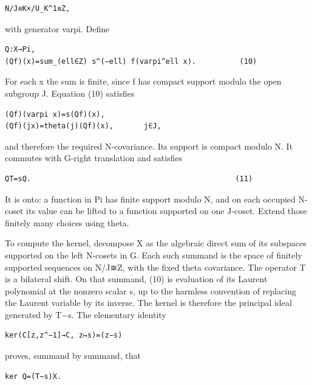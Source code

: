 \begin{Verbatim}[fontsize=\small,breaklines=true,breakanywhere=true]
N/J≅K×/U_K^1≅Z,
\end{Verbatim}

with generator varpi. Define

\begin{Verbatim}[fontsize=\small,breaklines=true,breakanywhere=true]
Q:X→Pi,
(Qf)(x)=sum_(ell∈Z) s^(−ell) f(varpi^ell x).          (10)
\end{Verbatim}

For each x the sum is finite, since f has compact support modulo the
open subgroup J. Equation (10) satisfies

\begin{Verbatim}[fontsize=\small,breaklines=true,breakanywhere=true]
(Qf)(varpi x)=s(Qf)(x),
(Qf)(jx)=theta(j)(Qf)(x),       j∈J,
\end{Verbatim}

and therefore the required N-covariance. Its support is compact modulo
N. It commutes with G-right translation and satisfies

\begin{Verbatim}[fontsize=\small,breaklines=true,breakanywhere=true]
QT=sQ.                                               (11)
\end{Verbatim}

It is onto: a function in Pi has finite support modulo N, and on each
occupied N-coset its value can be lifted to a function supported on one
J-coset. Extend those finitely many choices using theta.

To compute the kernel, decompose X as the algebraic direct sum of its
subspaces supported on the left N-cosets in G. Each such summand is the
space of finitely supported sequences on N/J≅Z, with the fixed theta
covariance. The operator T is a bilateral shift. On that summand, (10)
is evaluation of its Laurent polynomial at the nonzero scalar s, up to
the harmless convention of replacing the Laurent variable by its
inverse. The kernel is therefore the principal ideal generated by T−s.
The elementary identity

\begin{Verbatim}[fontsize=\small,breaklines=true,breakanywhere=true]
ker(C[z,z^−1]→C, z↦s)=(z−s)
\end{Verbatim}

proves, summand by summand, that

\begin{Verbatim}[fontsize=\small,breaklines=true,breakanywhere=true]
ker Q=(T−s)X.
\end{Verbatim}

